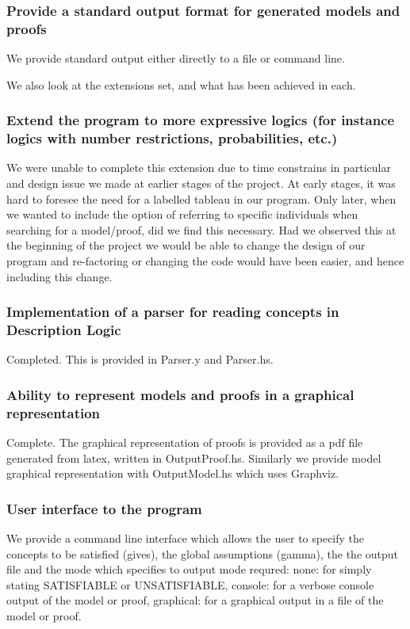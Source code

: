 \subsubsection*{Provide a standard output format for generated models and proofs}
We provide standard output either directly to a file or command line. 

We also look at the extensions set, and what has been achieved in each.

\subsubsection*{Extend the program to more expressive logics (for instance logics with number restrictions, probabilities, etc.) }
We were unable to complete this extension due to time constrains in particular and design issue we made at earlier stages of the project. At early stages, it was hard to foresee the need for a labelled tableau in our program. Only later, when we wanted to include the option of referring to specific individuals when searching for a model/proof, did we find this necessary. Had we observed this at the beginning of the project we would be able to change the design of our program and re-factoring or changing the code would have been easier, and hence including this change. 
\subsubsection*{Implementation of a parser for reading concepts in Description Logic}
Completed. This is provided in Parser.y and Parser.hs. 
\subsubsection*{Ability to represent models and proofs in a graphical representation}
Complete. The graphical representation of proofs is provided as a pdf file generated from latex, written in OutputProof.hs. Similarly we provide model graphical representation with OutputModel.hs which uses Graphviz.
\subsubsection*{User interface to the program}
We provide a command line interface which allows the user to specify the concepts to be satisfied (gives), the global assumptions (gamma), the the output file and the mode which specifies to output mode requred:
none: for simply stating SATISFIABLE or UNSATISFIABLE, console: for a verbose console output of the model or proof, graphical: for a graphical output in a file of the model or proof.
